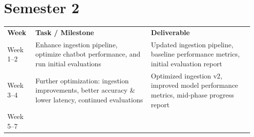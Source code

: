 \documentclass[12pt]{article}
\begin{document}
\section{\texorpdfstring{ Semester 2}{ Semester 2}}\label{semester-2}

{\def\LTcaptype{none} %
\begin{longtable}[]{@{}
  >{\raggedright\arraybackslash}p{}
  >{\raggedright\arraybackslash}p{}
  >{\raggedright\arraybackslash}p{}@{}}
\toprule\noalign{}
\begin{minipage}[b]{\linewidth}\centering
\textbf{Week}
\end{minipage} & \begin{minipage}[b]{\linewidth}\centering
\textbf{Task / Milestone}
\end{minipage} & \begin{minipage}[b]{\linewidth}\centering
\textbf{Deliverable}
\end{minipage} \\
\begin{minipage}[b]{\linewidth}\centering
Week 1--2
\end{minipage} & \begin{minipage}[b]{\linewidth}\centering
Enhance ingestion pipeline, optimize chatbot performance, and run
initial evaluations
\end{minipage} & \begin{minipage}[b]{\linewidth}\centering
Updated ingestion pipeline, baseline performance metrics, initial
evaluation report
\end{minipage} \\
\begin{minipage}[b]{\linewidth}\centering
Week 3--4
\end{minipage} & \begin{minipage}[b]{\linewidth}\centering
Further optimization: ingestion improvements, better accuracy \& lower
latency, continued evaluations
\end{minipage} & \begin{minipage}[b]{\linewidth}\centering
Optimized ingestion v2, improved model performance metrics, mid-phase
progress report
\end{minipage} \\
\begin{minipage}[b]{\linewidth}\centering
Week 5--7
\end{minipage} & \begin{minipage}[b]{\linewidth}\centering

\end{minipage}
\end{longtable}}
\end{document}
